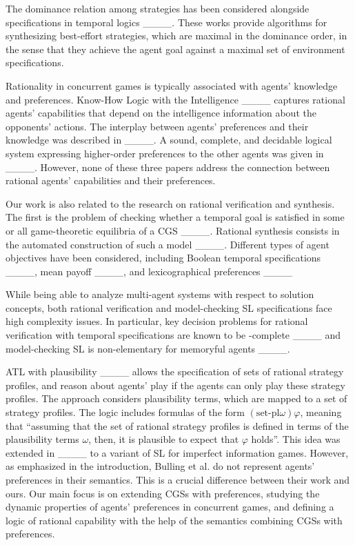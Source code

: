 The dominance relation among strategies has been considered alongside specifications in temporal logics  ____. These works provide algorithms for synthesizing best-effort strategies, which are maximal in the dominance order, in the sense that they achieve the agent goal against a maximal set of environment specifications.

Rationality in concurrent games is typically associated with  a\-gents' knowledge and preferences. Know-How Logic with the Intelligence ____ captures rational agents' capabilities that depend on the intelligence information about the opponents’ actions. The interplay between agents' preferences and their knowledge was described in ____. 
A sound, complete, and decidable logical system expressing higher-order preferences to the other agents was given in  ____. However, none of these three papers address the connection between rational agents' capabilities and their preferences.

Our work is also related to the research on rational verification and synthesis. The first is the problem of checking whether a temporal goal is satisfied in some or all game-theoretic equilibria of a CGS ____. Rational synthesis consists in the automated construction of such a model ____. 
Different types of agent objectives have been considered, including Boolean temporal specifications ____, mean payoff ____, and lexicographical preferences ____


While being able to analyze multi-agent systems with respect to solution concepts, both rational verification and model-checking SL specifications face high complexity issues. 
In particular, key decision problems for rational verification with temporal specifications are known to be \DExptime-complete ____ and model-checking  SL is non-elementary for memoryful agents ____. 

 

ATL with plausibility ____ allows the specification of sets of
rational strategy profiles, and reason about agents' play if the agents can only play  these strategy profiles. The approach considers plausibility terms, which are mapped to a set of strategy profiles.  
The logic includes formulas of the form $(\text{set-pl} \omega) \varphi$, meaning  that ``assuming that the set of rational strategy profiles is defined in terms of the plausibility terms $\omega$, then, it is
plausible to expect that $\varphi$ holds''. %
This idea was extended in  ____ to a variant of SL for imperfect information games.
However, as emphasized in the introduction, 
Bulling et al. do not 
represent 
agents' 
preferences in their  semantics. 
This is a crucial
difference between their work and ours.
Our main focus is
on  extending CGSs
with preferences,
studying the dynamic properties
of agents' preferences in concurrent games,
and defining a logic
of rational capability with the help
of the semantics
combining CGSs with preferences.